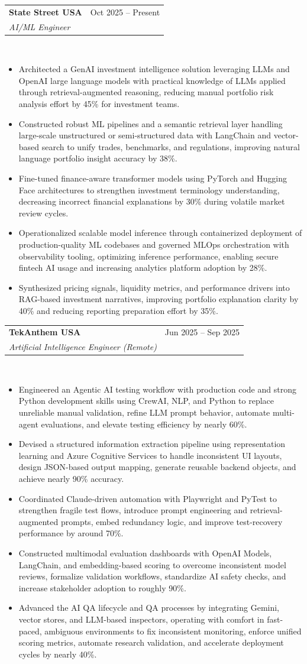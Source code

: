 \documentclass[letterpaper,11pt]{article}
\newcommand{\resumeItem}[1]{\item\small{{#1 \vspace{-3pt}}}}
\newcommand{\resumeSubheading}[4]{
  \vspace{-3pt}\item
    \begin{tabularx}{0.995\textwidth}[t]{Xr}
      \textbf{#1} & #2 \\
      \textit{\small#3} & \textit{\small #4} \\
    \end{tabularx}\\[-3pt]
    \vspace{3pt}
}
\newcommand{\resumeItemListStart}{\begin{itemize}}
\newcommand{\resumeItemListEnd}{\end{itemize}\vspace{-4pt}}
\begin{document}
\resumeSubheading{State Street USA}{Oct 2025 -- Present}{AI/ML Engineer}{}
\resumeItemListStart
\resumeItem{Architected a GenAI investment intelligence solution leveraging LLMs and OpenAI large language models with practical knowledge of LLMs applied through retrieval-augmented reasoning, reducing manual portfolio risk analysis effort by 45\% for investment teams.}
\resumeItem{Constructed robust ML pipelines and a semantic retrieval layer handling large-scale unstructured or semi-structured data with LangChain and vector-based search to unify trades, benchmarks, and regulations, improving natural language portfolio insight accuracy by 38\%.}
\resumeItem{Fine-tuned finance-aware transformer models using PyTorch and Hugging Face architectures to strengthen investment terminology understanding, decreasing incorrect financial explanations by 30\% during volatile market review cycles.}
\resumeItem{Operationalized scalable model inference through containerized deployment of production-quality ML codebases and governed MLOps orchestration with observability tooling, optimizing inference performance, enabling secure fintech AI usage and increasing analytics platform adoption by 28\%.}
\resumeItem{Synthesized pricing signals, liquidity metrics, and performance drivers into RAG-based investment narratives, improving portfolio explanation clarity by 40\% and reducing reporting preparation effort by 35\%.}
\resumeItemListEnd

\resumeSubheading{TekAnthem USA}{Jun 2025 -- Sep 2025}{Artificial Intelligence Engineer (Remote)}{}
\resumeItemListStart
\resumeItem{Engineered an Agentic AI testing workflow with production code and strong Python development skills using CrewAI, NLP, and Python to replace unreliable manual validation, refine LLM prompt behavior, automate multi-agent evaluations, and elevate testing efficiency by nearly 60\%.}
\resumeItem{Devised a structured information extraction pipeline using representation learning and Azure Cognitive Services to handle inconsistent UI layouts, design JSON-based output mapping, generate reusable backend objects, and achieve nearly 90\% accuracy.}
\resumeItem{Coordinated Claude-driven automation with Playwright and PyTest to strengthen fragile test flows, introduce prompt engineering and retrieval-augmented prompts, embed redundancy logic, and improve test-recovery performance by around 70\%.}
\resumeItem{Constructed multimodal evaluation dashboards with OpenAI Models, LangChain, and embedding-based scoring to overcome inconsistent model reviews, formalize validation workflows, standardize AI safety checks, and increase stakeholder adoption to roughly 90\%.}
\resumeItem{Advanced the AI QA lifecycle and QA processes by integrating Gemini, vector stores, and LLM-based inspectors, operating with comfort in fast-paced, ambiguous environments to fix inconsistent monitoring, enforce unified scoring metrics, automate research validation, and accelerate deployment cycles by nearly 40\%.}
\resumeItemListEnd
\end{document}
